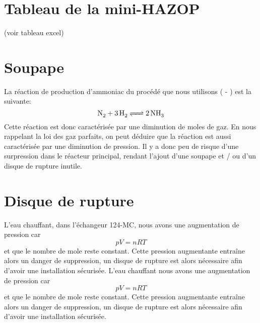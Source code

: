 \section{Tableau de la mini-HAZOP}

(voir tableau excel)

\section{Soupape}
La réaction de production d'ammoniac du procédé que nous utilisons ( - ) est la suivante:
$$\ce{N2 +3H2 <=> 2NH3}$$
Cette réaction est donc caractérisée par une diminution de moles de gaz. En nous rappelant la loi des gaz parfaits, on peut déduire que la réaction est aussi caractérisée par une diminution de pression. Il y a donc peu de risque d'une surpression dans le réacteur principal, rendant l'ajout d'une soupape et / ou d'un disque de rupture inutile.

\section{Disque de rupture}
L'eau chauffant, dans l'échangeur 124-MC, nous avons une augmentation de pression car $$pV=nRT$$ et que le nombre de mole reste constant. Cette pression augmentante entraîne alors un danger de suppression, un disque de rupture est alors nécessaire afin d'avoir une installation sécurisée.
L'eau chauffant nous avons une augmentation de pression car $$pV=nRT$$ et que le nombre de mole reste constant. Cette pression augmentante entraîne alors un danger de suppression, un disque de rupture est alors nécessaire afin d'avoir une installation sécurisée. 